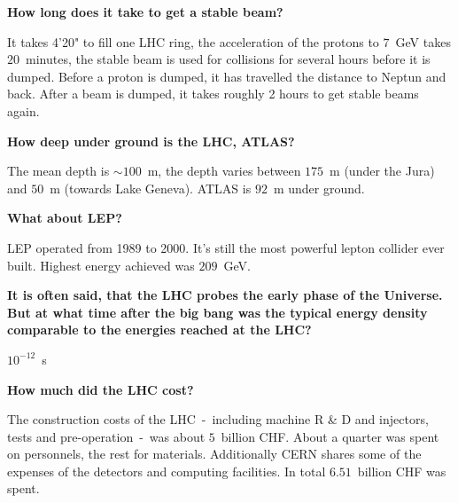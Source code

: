 \documentclass{atlasnote}
\newenvironment{question} %
{\noindent\bfseries}
{\par}
\newenvironment{answer} %
{}
{\vspace*{10pt}}
\newenvironment{faq} %
{\par\noindent\begin{minipage}{\linewidth}}
    {\end{minipage}\par}
\begin{document}
\begin{faq}
    \begin{question}
        How long does it take to get a stable beam?
    \end{question}
    \begin{answer}
        It takes 4'20" to fill one LHC ring, the acceleration of the protons to $7$~GeV takes $20$~minutes, the stable beam is used for collisions for several
        hours before it is dumped. Before a proton is dumped, it has travelled the distance to Neptun and back. After a beam is dumped, it takes roughly 2 hours
        to get stable beams again.
    \end{answer}
\end{faq}

\begin{faq}
    \begin{question}
        How deep under ground is the LHC, ATLAS?
    \end{question}
    \begin{answer}
        The mean depth is $\sim 100$~m, the depth varies between $175$~m (under the Jura) and $50$~m (towards Lake Geneva). ATLAS is $92$~m under ground.
    \end{answer}
\end{faq}

\begin{faq}
    \begin{question}
        What about LEP?
    \end{question}
    \begin{answer}
        LEP operated from 1989 to 2000. It's still the most powerful lepton collider ever built. Highest energy achieved was $209$~GeV.
    \end{answer}
\end{faq}

\begin{faq}
    \begin{question}
        It is often said, that the LHC probes the early phase of the Universe. But at what time after the big bang was the typical energy density comparable to the
        energies reached at the LHC?
    \end{question}
    \begin{answer}
        $10^{-12}$~s
    \end{answer}
\end{faq}

\begin{faq}
    \begin{question}
        How much did the LHC cost?
    \end{question}
    \begin{answer}
        The construction costs of the LHC~-~including machine R \& D and injectors, tests and pre-operation~-~was about $5$~billion CHF. About a quarter was spent on
        personnels, the rest for materials. Additionally CERN shares some of the expenses of the detectors and computing facilities. In total $6.51$~billion CHF was
        spent.
    \end{answer}
\end{faq}
\end{document}
